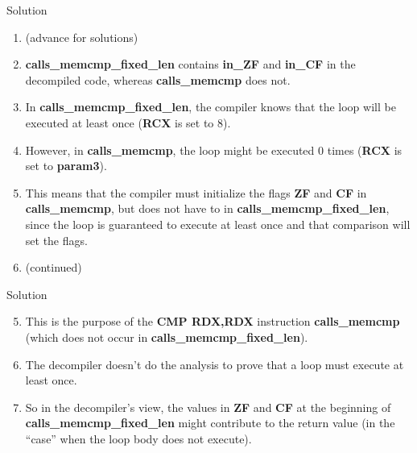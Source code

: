 \documentclass{beamer}
\begin{document}
\begin{frame}
\begin{block}{Solution}
\begin{enumerate}
\item[] (advance for solutions)
\pause 
\item \textbf{calls\_memcmp\_fixed\_len} contains \textbf{in\_ZF} and \textbf{in\_CF} in the decompiled code, whereas \textbf{calls\_memcmp} does not.
\item In \textbf{calls\_memcmp\_fixed\_len}, the compiler knows that the loop will be executed at least once (\textbf{RCX} is set to 8).
\item However, in \textbf{calls\_memcmp}, the loop might be executed 0 times (\textbf{RCX} is set to \textbf{param3}).
\item This means that the compiler must initialize the flags \textbf{ZF} and \textbf{CF} in \textbf{calls\_memcmp}, but does not have to in \textbf{calls\_memcmp\_fixed\_len}, since
the loop is guaranteed to execute at least once and that comparison will set the flags. 
\item[] (continued)
\end{enumerate}
\end{block}
\end{frame}

\begin{frame}
\begin{block}{Solution}
\begin{enumerate}
\setcounter{enumi}{4}
\item This is the purpose of the \textbf{CMP RDX,RDX} instruction \textbf{calls\_memcmp} (which does not occur in \textbf{calls\_memcmp\_fixed\_len}).
\item The decompiler doesn't do the analysis to prove that a loop must execute at least once.
\item So in the decompiler's view, the values in \textbf{ZF} and \textbf{CF} at the beginning of \textbf{calls\_memcmp\_fixed\_len} might contribute to the return value (in the ``case''
 when the loop body does not execute).
\end{enumerate}
\end{block}
\end{frame}
\end{document}
